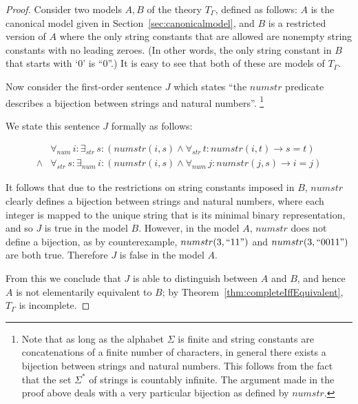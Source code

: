 \begin{proof}
  Consider two models $A, B$ of the theory $T_{\Gamma}$, defined as
  follows: $A$ is the canonical model given in
  Section~\ref{sec:canonicalmodel}, and $B$ is a restricted version of
  $A$ where the only string constants that are allowed
  are nonempty string constants with no leading zeroes. (In other
  words, the only string constant in $B$ that starts with `0' is
  ``0''.) It is easy to see that both of these are models of
  $T_{\Gamma}$.

  Now consider the first-order sentence $J$ which states ``the
  $numstr$ predicate describes a bijection between strings and natural
  numbers''.
\footnote{Note that as long as the alphabet $\Sigma$ is finite and
  string constants are concatenations of a finite number of
  characters, in general there exists a bijection between strings and
  natural numbers. This follows from the fact that the set $\Sigma^*$
  of strings is countably infinite. The argument made in the proof
  above deals with a very particular bijection as defined by
  $numstr$.}

We state this sentence $J$ formally as follows:

\begin{align*}
& \forall_{num} \, i : \exists_{str} \, s : \left( numstr(i,s) \land \forall_{str} \, t : numstr(i,t) \to s = t \right) \\
\land & \forall_{str} \, s : \exists_{num} \, i : \left( numstr(i,s) \land \forall_{num} \, j : numstr(j,s) \to i = j \right)
\end{align*}

  It follows that due to the restrictions on string constants imposed
  in $B$, $numstr$ clearly defines a bijection between strings and
  natural numbers, where each integer is mapped to the unique string
  that is its minimal binary representation, and so $J$ is true in the
  model $B$.  However, in the model $A$, $numstr$ does not define a
  bijection, as by counterexample, $numstr(3, ``11")$ and $numstr(3,
  ``0011")$ are both true.  Therefore $J$ is false in the model $A$.
  
  From this we conclude that $J$ is able to distinguish between $A$
  and $B$, and hence $A$ is not elementarily equivalent to $B$; by
  Theorem~\ref{thm:completeIffEquivalent}, $T_{\Gamma}$ is
  incomplete.
\end{proof}

